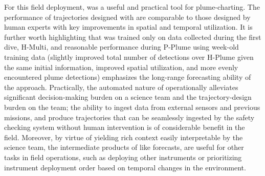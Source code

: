 For this field deployment, \PHORTEX was a useful and practical tool for plume-charting. The performance of trajectories designed with \PHORTEX are comparable to those designed by human experts with key improvements in spatial and temporal utilization. It is further worth highlighting that \PHORTEX was trained only on data collected during the first dive, H-Multi, and reasonable performance during P-Plume using week-old training data (slightly improved total number of detections over H-Plume given the same initial information, improved spatial utilization, and more evenly encountered plume detections) emphasizes the long-range forecasting ability of the approach. Practically, the automated nature of \PHORTEX operationally alleviates significant decision-making burden on a science team and the trajectory-design burden on the \Sentry team; the ability to ingest data from external sensors and previous \Sentry missions, and produce trajectories that can be seamlessly ingested by the safety checking system without human intervention is of considerable benefit in the field. Moreover, by virtue of yielding rich context easily interpretable by the science team, the intermediate products of \PHORTEX like \PHUMES forecasts, are useful for other tasks in field operations, such as deploying other instruments or prioritizing instrument deployment order based on temporal changes in the environment. 


